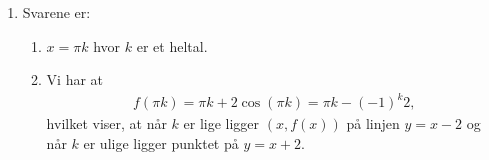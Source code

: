 \begin{enumerate}
	
	\item\label{it:diff13} Svarene er: 
	\begin{enumerate}
		\item $x=\pi k$ hvor $k$ er et heltal.
		\item Vi har at 
	\begin{align*}
	f(\pi k)=\pi k+2\cos(\pi k)=\pi k-(-1)^k 2,
	\end{align*}
	hvilket viser, at når $k$ er lige ligger $(x,f(x)) $ på linjen $y=x-2$ og når $k$ er ulige ligger punktet på $y=x+2$.
	\end{enumerate}
	

\end{enumerate}
